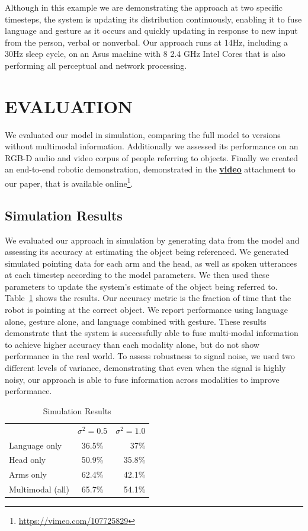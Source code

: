 \documentclass[letterpaper, 10 pt, conference]{ieeeconf}
\begin{document}
Although in this example we are demonstrating the approach at two
specific timesteps, the system is updating its distribution
continuously, enabling it to fuse language and gesture as it occurs
and quickly updating in response to new input from the person, verbal
or nonverbal.  Our approach runs at 14Hz, including a 30Hz sleep
cycle, on an Asus machine with 8 2.4 GHz Intel Cores that is also
performing all perceptual and network processing. 

\section{EVALUATION}

We evaluated our model in simulation, comparing the full model to
versions without multimodal information.  Additionally we assessed its
performance on an RGB-D audio and video corpus of people referring to
objects.  Finally we created an end-to-end robotic demonstration,
demonstrated in the \href{https://vimeo.com/107725829}{\textbf{video}} attachment to our paper, that is available
online\footnote{\url{https://vimeo.com/107725829}}.

\subsection{Simulation Results}

We evaluated our approach in simulation by generating data from the
model and assessing its accuracy at estimating the object being
referenced.  We generated simulated pointing data for each arm and the
head, as well as spoken utterances at each timestep according to the
model parameters.  We then used these parameters to update the
system's estimate of the object being referred to.
Table~\ref{table:sim_results} shows the results.  Our accuracy metric
is the fraction of time that the robot is pointing at the correct
object.  We report performance using language alone, gesture alone,
and language combined with gesture.  These results demonstrate that
the system is successfully able to fuse multi-modal information to
achieve higher accuracy than each modality alone, but do not show
performance in the real world.  To assess robustness to signal noise,
we used two different levels of variance, demonstrating that even when
the signal is highly noisy, our approach is able to fuse information
across modalities to improve performance.

\begin{table}
\centering
\caption{Simulation Results\label{table:sim_results}}
\begin{tabular}{lcr}
\toprule
& $\sigma^2 = 0.5$ & $\sigma^2 = 1.0$\\
Language only &  36.5\% & 37\%\\
Head only & 50.9\% & 35.8\%\\
Arms only & 62.4\% & 42.1\%\\
Multimodal (all)&  65.7\% & 54.1\%\\
\bottomrule
\end{tabular}
\end{table}
\end{document}
